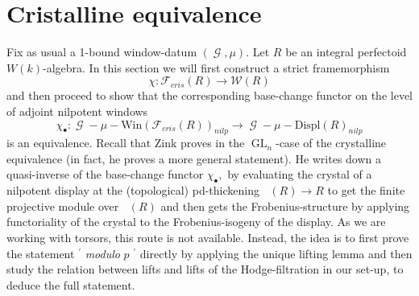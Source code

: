 \documentclass[a4paper,10,5 pt]{amsart}
\theoremstyle{definition}
\DeclareMathOperator{\GL}{GL}
\DeclareMathOperator{\Acris}{\mathbb{A}_{cris}}
\DeclareMathOperator{\G}{\mathcal{G}}
\begin{document}
\section{Cristalline equivalence}
Fix as usual a 1-bound window-datum $(\G,\mu)$.
Let $R$ be an integral perfectoid $W(k)$-algebra. In this section we will first construct a strict framemorphism
$$
\chi\colon \mathcal{F}_{cris}(R)\rightarrow \mathcal{W}(R)
$$
and then proceed to show that the corresponding base-change functor on the level of adjoint nilpotent windows
$$
\chi_{\bullet}\colon \G-\mu-\text{Win}(\mathcal{F}_{cris}(R))_{nilp}\rightarrow \G-\mu-\text{Displ}(R)_{nilp}
$$
is an equivalence. Recall that Zink proves in \cite{zink-windows} the $\GL_{n}$-case of the crystalline equivalence (in fact, he proves a more general statement). He writes down a quasi-inverse of the base-change functor $\chi_{\bullet},$ by evaluating the crystal of a nilpotent display at the (topological) pd-thickening $\Acris(R)\rightarrow R$ to get the finite projective module over $\Acris(R)$ and then gets the Frobenius-structure by applying functoriality of the crystal to the Frobenius-isogeny of the display. As we are working with torsors, this route is not available. Instead,  the idea is to first prove the statement $^{\prime}$ \textit{modulo }$p$ $^{\prime}$ directly by applying the unique lifting lemma and then study the relation between lifts and lifts of the Hodge-filtration in our set-up, to deduce the full statement.
\end{document}
